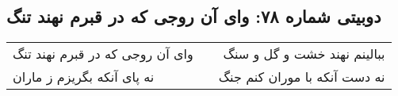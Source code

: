 \begin{center}
\section*{دوبیتی شماره ۷۸: وای آن روجی که در قبرم نهند تنگ}
\label{sec:078}
\begin{longtable}{l p{0.5cm} r}
وای آن روجی که در قبرم نهند تنگ
&&
ببالینم نهند خشت و گل و سنگ
\\
نه پای آنکه بگریزم ز ماران
&&
نه دست آنکه با موران کنم جنگ
\\
\end{longtable}
\end{center}
